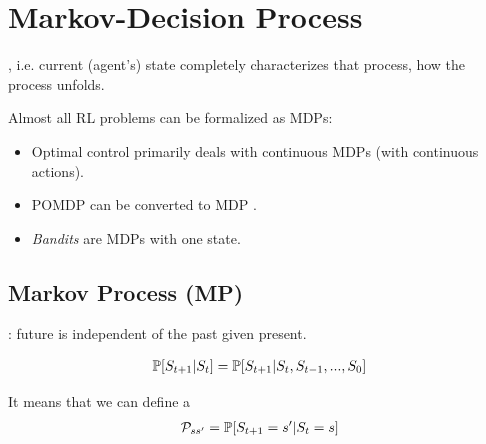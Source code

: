\section{Markov-Decision Process}

, i.e. current (agent's) state completely characterizes that process, how the process unfolds.


Almost all RL problems can be formalized as MDPs:
\begin{itemize}
	\item Optimal control primarily deals with continuous MDPs (with continuous actions).
	\item POMDP can be converted to MDP	.
	\item \textit{Bandits} are MDPs with one state.
\end{itemize}



\subsection{Markov Process (MP)}

: future is independent of the past given present.

\begin{align}
	\mathbb{P}[S_{t+1} | S_t] = 	\mathbb{P}[S_{t+1} | S_t, S_{t-1}, ..., S_{0}]
\end{align}

It means that we can define a 
\begin{align}
	\mathcal{P}_{ss'} = \mathbb{P}[S_{t+1} = s' | S_t = s]
\end{align}



